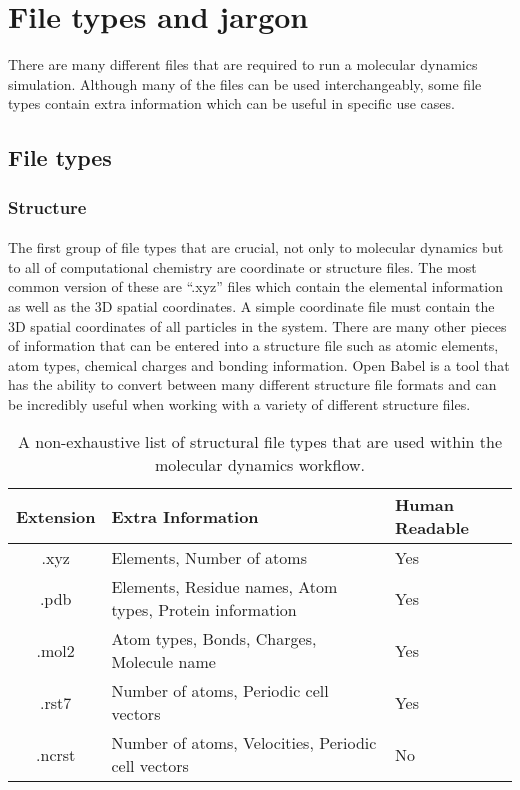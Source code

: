 \section{File types and jargon}
    There are many different files that are required to run a molecular dynamics simulation. Although many of the files can be used interchangeably, some file types contain extra information which can be useful in specific use cases. 

\subsection{File types}
    \subsubsection{Structure}
    \paragraph{}
        The first group of file types that are crucial, not only to molecular dynamics but to all of computational chemistry are coordinate or structure files. The most common version of these are \enquote{.xyz} files which contain the elemental information as well as the 3D spatial coordinates. A simple coordinate file must contain the 3D spatial coordinates of all particles in the system. There are many other pieces of information that can be entered into a structure file such as atomic elements, atom types, chemical charges and bonding information. Open Babel is a tool that has the ability to convert between many different structure file formats and can be incredibly useful when working with a variety of different structure files.

    \begin{table}[H]
        \centering
        \begin{tabular}{@{}cll@{}}
            \toprule
           \multicolumn{1}{l}{\textbf{Extension}}  &  \textbf{Extra Information} & \textbf{Human Readable} \\ \midrule
           .xyz & Elements, Number of atoms & Yes \\
           .pdb & Elements, Residue names, Atom types, Protein information  & Yes \\
           .mol2 & Atom types, Bonds, Charges, Molecule name & Yes \\
           .rst7 & Number of atoms, Periodic cell vectors & Yes \\
           .ncrst & Number of atoms, Velocities, Periodic cell vectors & No \\
           \bottomrule
        \end{tabular}
        \caption{A non-exhaustive list of structural file types that are used within the molecular dynamics workflow.}
        \label{tab:structFiles}
    \end{table}

